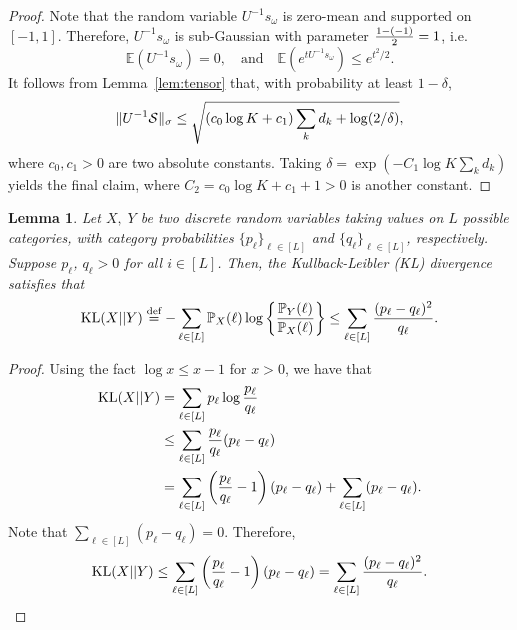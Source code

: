 \documentclass[11pt]{article}
\theoremstyle{plain}
\newtheorem{lem}{Lemma}
\theoremstyle{definition}
\begin{document}
\begin{proof}  Note that the random variable $U^{-1}s_{\omega}$ is zero-mean and supported on $[-1,1]$. Therefore, $U^{-1}s_{\omega}$ is sub-Gaussian with parameter ${1-(-1)\over 2}=1$, i.e.
\[
\mathbb{E}(U^{-1}s_{\omega})=0,\quad \text{and}\quad \mathbb{E}(e^{tU^{-1}s_{\omega}})\leq e^{t^2/2}.
\]
It follows from Lemma~\ref{lem:tensor} that, with probability at least $1-\delta$,
\[
\lVert U^{-1}\mathcal{S}\rVert_\sigma\leq \sqrt{\left(c_0\log K+c_1\right) \sum_k d_k +\log (2/\delta)},
\]
where $c_0, c_1>0$ are two absolute constants. Taking $\delta=\exp (-C_1\log K \sum_k d_k)$ yields the final claim, where $C_2=c_0\log K+c_1+1>0$ is another constant.
\end{proof}


\begin{lem}\label{lem:KLentry} Let $X,\; Y$ be two discrete random variables taking values on $L$ possible categories, with category probabilities $\{p_\ell\}_{\ell\in[L]}$ and $\{q_\ell\}_{\ell\in[L]}$, respectively.  Suppose $p_\ell$, $q_\ell>0$ for all $i\in[L]$. Then, the Kullback-Leibler (KL) divergence satisfies that
\[
\text{KL}(X||Y)\stackrel{\text{def}}{=}-\sum_{\ell\in[L]}\mathbb{P}_X(\ell)\log\left\{{\mathbb{P}_Y(\ell)\over \mathbb{P}_X(\ell)}\right\} \leq \sum_{\ell \in [L]}{(p_\ell-q_\ell)^2 \over q_\ell}.
\]
\end{lem}
\begin{proof} Using the fact $\log x\leq x-1$ for $x>0$, we have that
\begin{align}\label{eq:KL}
\text{KL}(X||Y)&=\sum_{\ell\in[L]}p_\ell\log{p_\ell\over q_\ell}\\
&\leq \sum_{\ell\in[L]} {p_\ell\over q_\ell}(p_\ell-q_\ell)\\
&=\sum_{\ell\in[L]} \left({p_\ell\over q_\ell }- 1\right)(p_\ell-q_\ell)+ \sum_{\ell\in[L]} (p_\ell-q_\ell).
\end{align}
Note that $\sum_{\ell\in[L]}(p_\ell-q_\ell)=0$. Therefore,
\[
\text{KL}(X||Y)\leq \sum_{\ell\in[L]}\left( {p_\ell\over q_\ell}-1\right)\left(p_\ell-q_\ell\right)=\sum_{\ell\in[L]}{(p_\ell-q_\ell)^2\over q_\ell}.
\]
\end{proof}
\end{document}
